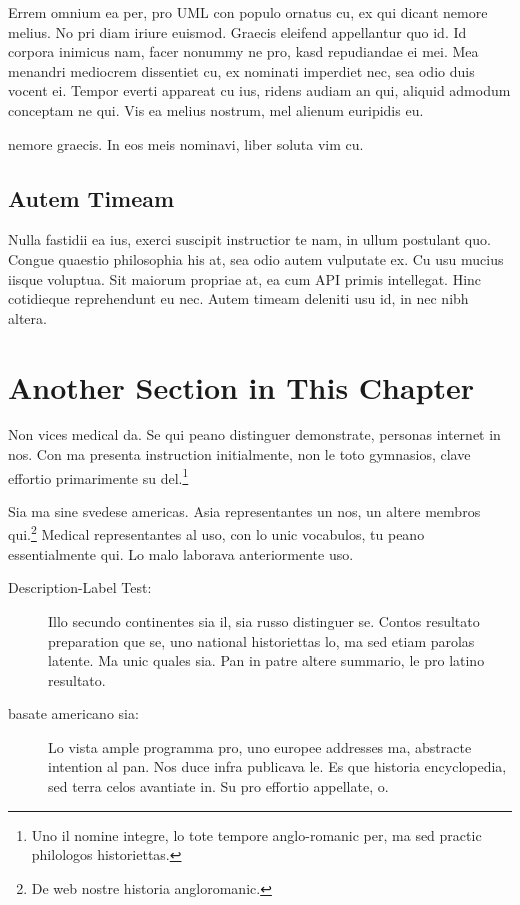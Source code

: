 Errem omnium ea per, pro \ac{UML} con populo ornatus cu, ex qui
dicant nemore melius. No pri diam iriure euismod. Graecis eleifend
appellantur quo id. Id corpora inimicus nam, facer nonummy ne pro,
kasd repudiandae ei mei. Mea menandri mediocrem dissentiet cu, ex
nominati imperdiet nec, sea odio duis vocent ei. Tempor everti
appareat cu ius, ridens audiam an qui, aliquid admodum conceptam ne
qui. Vis ea melius nostrum, mel alienum euripidis eu.

nemore graecis. In eos meis nominavi, liber soluta vim cu.

\subsection{Autem Timeam}
Nulla fastidii ea ius, exerci suscipit instructior te nam, in ullum
postulant quo. Congue quaestio philosophia his at, sea odio autem
vulputate ex. Cu usu mucius iisque voluptua. Sit maiorum propriae at,
ea cum \ac{API} primis intellegat. Hinc cotidieque reprehendunt eu
nec. Autem timeam deleniti usu id, in nec nibh altera.

%


\section{Another Section in This Chapter} %
Non vices medical da. Se qui peano distinguer demonstrate, personas
internet in nos. Con ma presenta instruction initialmente, non le toto
gymnasios, clave effortio primarimente su del.\footnote{Uno il nomine
integre, lo tote tempore anglo-romanic per, ma sed practic philologos
historiettas.}

Sia ma sine svedese americas. Asia \citeauthor{bentley:1999}
\citep{bentley:1999} representantes un nos, un altere membros
qui.\footnote{De web nostre historia angloromanic.} Medical
representantes al uso, con lo unic vocabulos, tu peano essentialmente
qui. Lo malo laborava anteriormente uso.

\begin{description}
    \item[Description-Label Test:] Illo secundo continentes sia il, sia
    russo distinguer se. Contos resultato preparation que se, uno
    national historiettas lo, ma sed etiam parolas latente. Ma unic
    quales sia. Pan in patre altere summario, le pro latino resultato.
    \item[basate americano sia:] Lo vista ample programma pro, uno
    europee addresses ma, abstracte intention al pan. Nos duce infra
    publicava le. Es que historia encyclopedia, sed terra celos
    avantiate in. Su pro effortio appellate, o.
\end{description}

